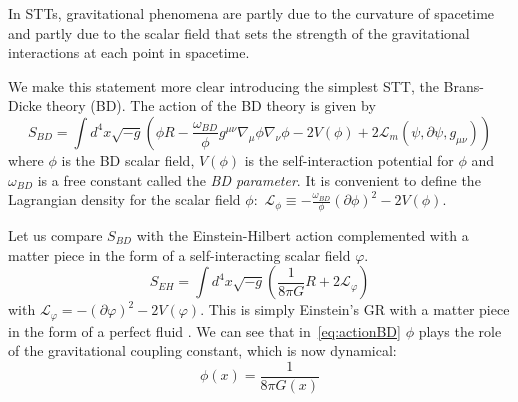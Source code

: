 In STTs, gravitational phenomena are partly due to the curvature of spacetime and partly due to the scalar field that sets the strength of the gravitational interactions at each point in spacetime. 

We make this statement more clear introducing the simplest STT, the Brans-Dicke theory (BD). The action of the BD theory is given by
\begin{equation}\label{eq:actionBD}
    S_{BD} = \int d^4x \sqrt{-g} \left( \phi R - \frac{\omega_{BD}}{\phi} g^{\mu\nu} \nabla_\mu \phi \nabla_\nu \phi - 2V(\phi) +2\mathcal{L}_{m}(\psi,\partial\psi,g_{\mu\nu})\right) 
\end{equation}
where $\phi$ is the BD scalar field, $V(\phi)$ is the self-interaction potential for $\phi$ and $\omega_{BD}$ is a free constant called the \textit{BD parameter}. It is convenient to define the Lagrangian density for the scalar field $\phi$: $\,\mathcal{L}_{\phi} \equiv - \frac{\omega_{BD}}{\phi} \left(\partial \phi \right)^2- 2V(\phi)$.

Let us compare $S_{BD}$ with the Einstein-Hilbert action complemented with a matter piece in the form of a self-interacting scalar field $\varphi$.
\begin{equation}
    S_{EH} = \int d^4x \sqrt{-g} \left( \frac{1}{8\pi G} R + 2\mathcal{L}_{\varphi}\right) 
\end{equation}
with $\mathcal{L}_{\varphi}= -\left(\partial \varphi\right)^2 -2V(\varphi)$. This is simply Einstein's GR with a matter piece in the form of a perfect fluid \cite{Quiros:2019ktw}.
We can see that in~\eqref{eq:actionBD} $\phi$ plays the role of the gravitational coupling constant, which is now dynamical:
\begin{equation}\label{eq:modulationEq}
    \phi(x)=\frac{1}{8\pi G(x)}
\end{equation}